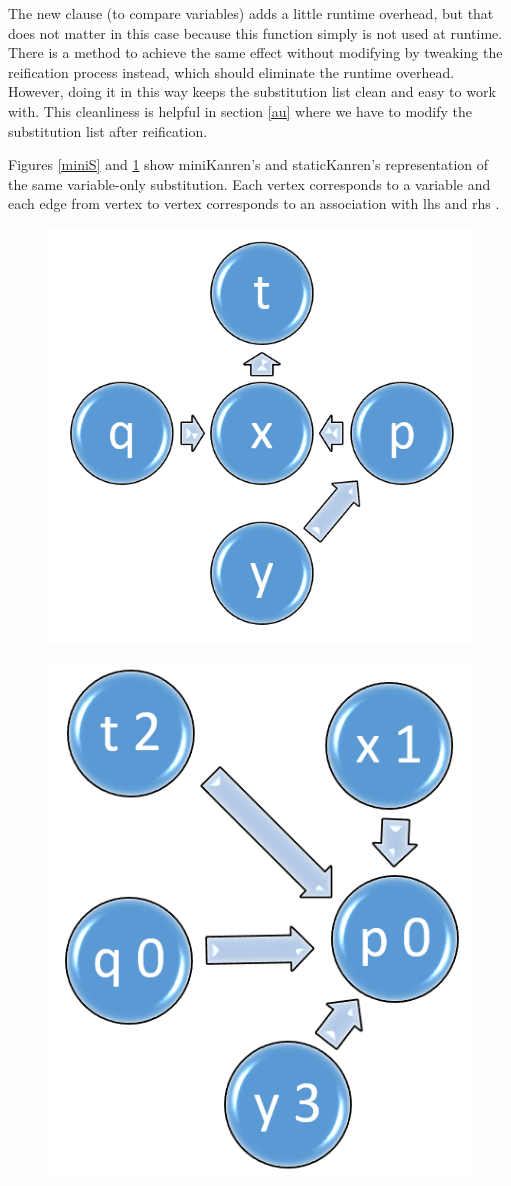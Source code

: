 The new clause (to compare variables) adds a little runtime overhead, but that does not matter in this case because this function simply is not used at runtime. There is a method to achieve the same effect without modifying  by tweaking the reification process instead, which should eliminate the runtime overhead. However, doing it in this way keeps the substitution list clean and easy to work with. This cleanliness is helpful in section \ref{au} where we have to modify the substitution list after reification.

Figures \ref{miniS} and \ref{staticS} show miniKanren's and staticKanren's representation of the same variable-only substitution. Each vertex corresponds to a variable and each edge from vertex  to vertex  corresponds to an association with lhs  and rhs .

\begin{figure}[h]
    \centering
    \begin{minipage}{.5\textwidth}
        \includegraphics[height=.5\textwidth]{figures/miniS.png}
        \label{miniS}
    \end{minipage}%
    \begin{minipage}{.5\textwidth}
        \includegraphics[height=.5\textwidth]{figures/staticS.png}
        \label{staticS}
    \end{minipage}
\end{figure}

